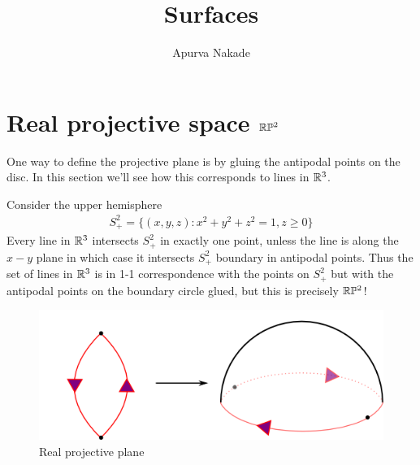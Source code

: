 \title{Surfaces}
\author{Apurva Nakade}
\thispagestyle{fancy}
\maketitle



\section{Real projective space $\mathbb{R}\mathbb{P}^2$}
One way to define the projective plane is by gluing the antipodal points on the disc. In this section we'll see how this corresponds to lines in $\mathbb{R}^3$.

Consider the upper hemisphere
\begin{align*}
	S^2_+ = \{ (x,y,z) : x^2 + y^2 + z^2 = 1 , z\ge 0\}
\end{align*}
Every line in $\mathbb{R}^3$ intersects $S^2_+$ in exactly one point, unless the line is along the $x-y$ plane in which case it intersects $S^2_+$ boundary in antipodal points. Thus the set of lines in $\mathbb{R}^3$ is in 1-1 correspondence with the points on $S^2_+$ but with the antipodal points on the boundary circle glued, but this is precisely $\mathbb{R}\mathbb{P}^2$!

\begin{figure}[H]
	\centering
	\includegraphics[width=0.25\linewidth]{images/ProjectivePlane}
	\caption{Real projective plane}
\end{figure}


